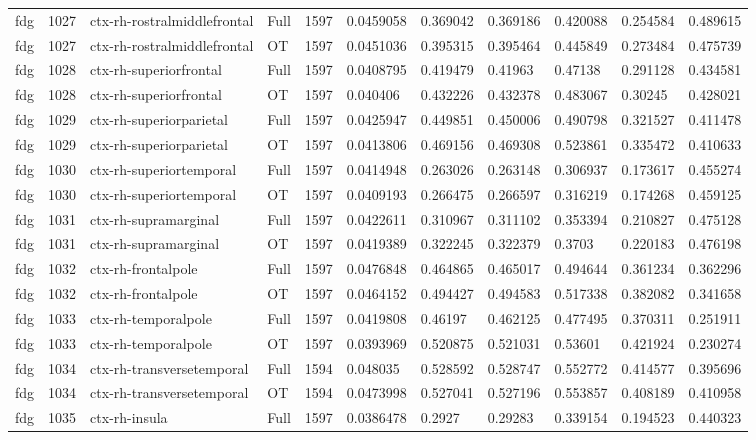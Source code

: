 \begin{landscape}
\begin{longtable}{lllllllllll}
fdg & 1027 & ctx-rh-rostralmiddlefrontal & Full & 1597 & 0.0459058 & 0.369042 & 0.369186 & 0.420088 & 0.254584 & 0.489615 \\
fdg & 1027 & ctx-rh-rostralmiddlefrontal & OT & 1597 & 0.0451036 & 0.395315 & 0.395464 & 0.445849 & 0.273484 & 0.475739 \\
fdg & 1028 & ctx-rh-superiorfrontal & Full & 1597 & 0.0408795 & 0.419479 & 0.41963 & 0.47138 & 0.291128 & 0.434581 \\
fdg & 1028 & ctx-rh-superiorfrontal & OT & 1597 & 0.040406 & 0.432226 & 0.432378 & 0.483067 & 0.30245 & 0.428021 \\
fdg & 1029 & ctx-rh-superiorparietal & Full & 1597 & 0.0425947 & 0.449851 & 0.450006 & 0.490798 & 0.321527 & 0.411478 \\
fdg & 1029 & ctx-rh-superiorparietal & OT & 1597 & 0.0413806 & 0.469156 & 0.469308 & 0.523861 & 0.335472 & 0.410633 \\
fdg & 1030 & ctx-rh-superiortemporal & Full & 1597 & 0.0414948 & 0.263026 & 0.263148 & 0.306937 & 0.173617 & 0.455274 \\
fdg & 1030 & ctx-rh-superiortemporal & OT & 1597 & 0.0409193 & 0.266475 & 0.266597 & 0.316219 & 0.174268 & 0.459125 \\
fdg & 1031 & ctx-rh-supramarginal & Full & 1597 & 0.0422611 & 0.310967 & 0.311102 & 0.353394 & 0.210827 & 0.475128 \\
fdg & 1031 & ctx-rh-supramarginal & OT & 1597 & 0.0419389 & 0.322245 & 0.322379 & 0.3703 & 0.220183 & 0.476198 \\
fdg & 1032 & ctx-rh-frontalpole & Full & 1597 & 0.0476848 & 0.464865 & 0.465017 & 0.494644 & 0.361234 & 0.362296 \\
fdg & 1032 & ctx-rh-frontalpole & OT & 1597 & 0.0464152 & 0.494427 & 0.494583 & 0.517338 & 0.382082 & 0.341658 \\
fdg & 1033 & ctx-rh-temporalpole & Full & 1597 & 0.0419808 & 0.46197 & 0.462125 & 0.477495 & 0.370311 & 0.251911 \\
fdg & 1033 & ctx-rh-temporalpole & OT & 1597 & 0.0393969 & 0.520875 & 0.521031 & 0.53601 & 0.421924 & 0.230274 \\
fdg & 1034 & ctx-rh-transversetemporal & Full & 1594 & 0.048035 & 0.528592 & 0.528747 & 0.552772 & 0.414577 & 0.395696 \\
fdg & 1034 & ctx-rh-transversetemporal & OT & 1594 & 0.0473998 & 0.527041 & 0.527196 & 0.553857 & 0.408189 & 0.410958 \\
fdg & 1035 & ctx-rh-insula & Full & 1597 & 0.0386478 & 0.2927 & 0.29283 & 0.339154 & 0.194523 & 0.440323 \\

\end{longtable}
\end{landscape}
